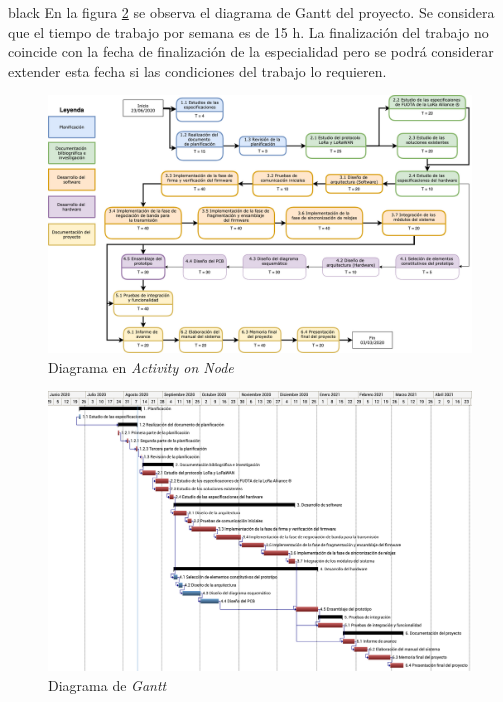 \documentclass[11pt]{charter}
\begin{document}
\begin{consigna}{black}
En la figura \ref{fig:gantt} se observa el diagrama de Gantt del proyecto. Se considera que el tiempo de trabajo por semana es de 15 h. La finalización del trabajo no coincide con la fecha de finalización de la especialidad pero se podrá considerar extender esta fecha si las condiciones del trabajo lo requieren.
\end{consigna}

\begin{landscape}
	\begin{figure}
		\centering 
		\includegraphics[width=20cm]{./Figuras/AoN.png}
		\caption{Diagrama en \textit{Activity on Node}}
		\label{fig:AoN}
	\end{figure}
\end{landscape}

\begin{landscape}
	\begin{figure}
		\centering 
		\includegraphics[width=20cm]{./Figuras/DiagramaGantt.png}
		\caption{Diagrama de \textit{Gantt}}
		\label{fig:gantt}
	\end{figure}
\end{landscape}
\end{document}
